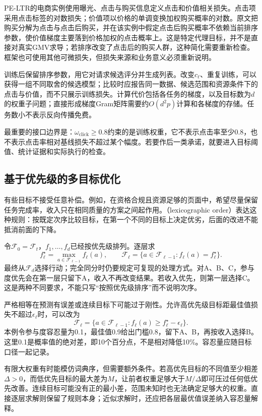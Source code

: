 PE-LTR的电商实例使用曝光、点击与购买信息定义点击和价值相关损失。点击项采用点击标签的对数损失；价值项以价格的单调变换加权购买概率的对数。原文把购买分解为点击与点击后购买，并在该实例中假定点击后购买概率不依赖当前排序参数，使价值梯度主要落到价格加权的点击概率上。这是特定代理目标，并不是直接对真实GMV求导；若排序改变了点击后的购买人群，这种简化需要重新检查。框架也可使用其他可微损失，但损失来源和业务意义必须重新说明。

训练后保留排序参数，用它对请求候选评分并生成列表。改变$c_\ell$、重复训练，可以获得一组不同取舍的候选模型；比较时应报告同一数据、候选范围和资源条件下的点击与价值，而不只展示训练损失。计算代价包括各任务的梯度，以及目标数为$d$的权重子问题；直接形成梯度Gram矩阵需要约$O(d^2p)$计算和各梯度的存储。任务数小不表示反向传播免费。

最重要的接口边界是：$\omega_{\mathrm{click}}\geq0.8$约束的是训练权重，它不表示点击率至少0.8，也不表示点击率相对基线损失不超过某个幅度。若要作后一类承诺，就要进入目标阈值、统计证据和实际执行的检查。

\subsection{基于优先级的多目标优化}
\label{sec:rs-priority-objectives}

有些目标不接受任意补偿。例如，在资格合规且资源足够的页面中，希望尽量保留任务完成率，收入只在相同质量的方案之间起作用。（lexicographic order）表达这种规则：按既定次序比较目标，在第一个不同的目标上决定优劣，后面的改进不能抵消前面的下降。

令$\mathcal{F}_0=\mathcal{F}_t$，$f_1,\ldots,f_d$已经按优先级排列。逐层求
\[
 f_\ell^\star=\max_{a\in\mathcal{F}_{\ell-1}}f_\ell(a),
 \qquad
 \mathcal{F}_\ell=
 \{a\in\mathcal{F}_{\ell-1}:f_\ell(a)=f_\ell^\star\}.
\]
最终从$\mathcal{F}_d$选择行动；完全同分时仍要规定可复现的处理方式。对A、B、C，参与度优先会在第一层只留下A，收入不再改变结果。若收入优先，则第一层选择C。这是两种不同要求，不能只写“按照优先级排序”而不说明次序。

严格相等在预测有误差或连续目标下可能过于刚性。允许高优先级目标距最佳值损失不超过$\epsilon_\ell$时，可以改为
\[
 \mathcal{F}_\ell=
 \{a\in\mathcal{F}_{\ell-1}:
       f_\ell(a)\geq f_\ell^\star-\epsilon_\ell\}.
\]
本例令参与度容忍量为0.1，最佳值0.9给出门槛0.8，留下A、B，再按收入选择B。这里0.1是概率值的绝对差，即10个百分点，不是相对降低10\%。容忍量应随目标口径一起记录。

有限大权重有时能模仿词典序，但需要额外条件。若高优先目标的不同值至少相差$\Delta>0$，而低优先目标的最大差为$M$，让前者权重足够大于$M/\Delta$即可压过任何低优先改善。连续目标可能没有正的最小差，范围未知时也无法确定足够大的权重。直接逐层求解则保留了规则本身；近似求解时，还应把各层最优值误差纳入容忍量解释。

